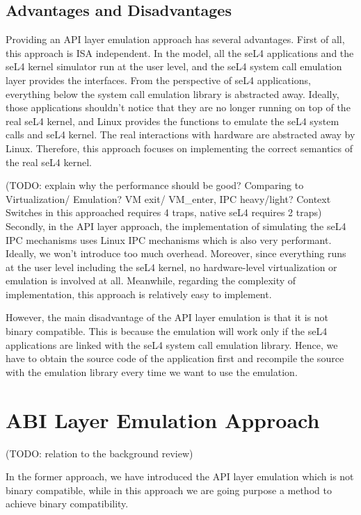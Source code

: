 \subsection{Advantages and Disadvantages}

Providing an API layer emulation approach has several advantages. First of all, this approach is ISA independent. In the model, all the seL4 applications and the seL4 kernel simulator run at the user level, and the seL4 system call emulation layer provides the interfaces. From the perspective of seL4 applications, everything below the system call emulation library is abstracted away. Ideally, those applications shouldn't notice that they are no longer running on top of the real seL4 kernel, and Linux provides the functions to emulate the seL4 system calls and seL4 kernel. The real interactions with hardware are abstracted away by Linux. Therefore, this approach focuses on implementing the correct semantics of the real seL4 kernel.

(TODO: explain why the performance should be good? Comparing to Virtualization/ Emulation? VM exit/ VM_enter, IPC heavy/light? Context Switches in this approached requires 4 traps, native seL4 requires 2 traps) Secondly, in the API layer approach, the implementation of simulating the seL4 IPC mechanisms uses Linux IPC mechanisms which is also very performant. Ideally, we won't introduce too much overhead. Moreover, since everything runs at the user level including the seL4 kernel, no hardware-level virtualization or emulation is involved at all. Meanwhile, regarding the complexity of implementation, this approach is relatively easy to implement.

However, the main disadvantage of the API layer emulation is that it is not binary compatible. This is because the emulation will work only if the seL4 applications are linked with the seL4 system call emulation library. Hence, we have to obtain the source code of the application first and recompile the source with the emulation library every time we want to use the emulation.    

\section{ABI Layer Emulation Approach}

(TODO: relation to the background review)

In the former approach, we have introduced the API layer emulation which is not binary compatible, while in this approach we are going purpose a method to achieve binary compatibility. 

